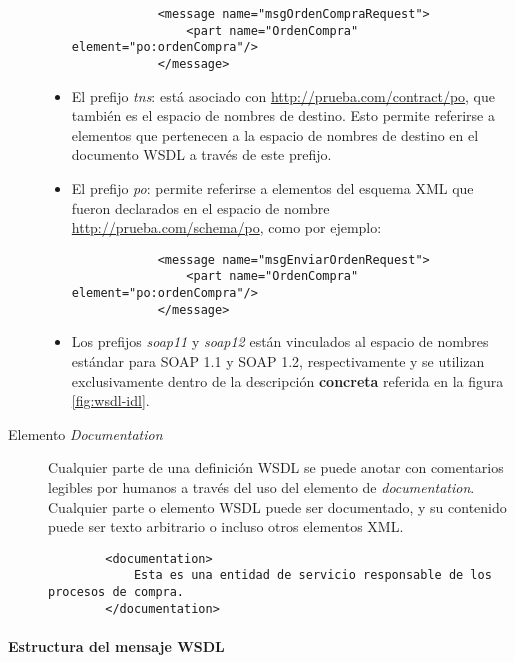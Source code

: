 \begin{description}
\begin{itemize}
 	 
 		\begin{lstlisting}
 			<message name="msgOrdenCompraRequest">
 				<part name="OrdenCompra" element="po:ordenCompra"/>
 			</message>
 		\end{lstlisting}
 		
 		\item El prefijo \textit{tns}: está asociado con \url{http://prueba.com/contract/po}, que también es el espacio de nombres de destino. Esto permite referirse a elementos que pertenecen a la
 		espacio de nombres de destino en el documento WSDL a través de este prefijo.
 		
 		\item El prefijo \textit{po}: permite referirse a elementos del esquema XML que fueron declarados en el espacio de nombre   \url{http://prueba.com/schema/po},  como por ejemplo:
 		
 		\begin{lstlisting}
 			<message name="msgEnviarOrdenRequest">
 				<part name="OrdenCompra" element="po:ordenCompra"/>
 			</message>
 		\end{lstlisting}
 		
 		\item Los prefijos  \textit{soap11} y \textit{soap12} están vinculados al espacio de nombres estándar  para SOAP 1.1 y SOAP 1.2, respectivamente y se utilizan exclusivamente dentro de la  descripción \textbf{concreta} referida en la figura \ref{fig:wsdl-idl}.
 		
 	\end{itemize}
 	
 	\item[Elemento \textit{Documentation}]
 	Cualquier parte de una definición WSDL se puede anotar con comentarios legibles por humanos a través del uso del elemento de \textit{documentation}. Cualquier parte o elemento WSDL puede ser documentado, y su contenido puede ser texto arbitrario o incluso otros elementos XML.
 	
 	\begin{lstlisting}
 		<documentation>
 			Esta es una entidad de servicio responsable de los procesos de compra.
 		</documentation>
 	\end{lstlisting}
 		
 \end{description}
 
 \paragraph{Estructura del mensaje WSDL}
 
